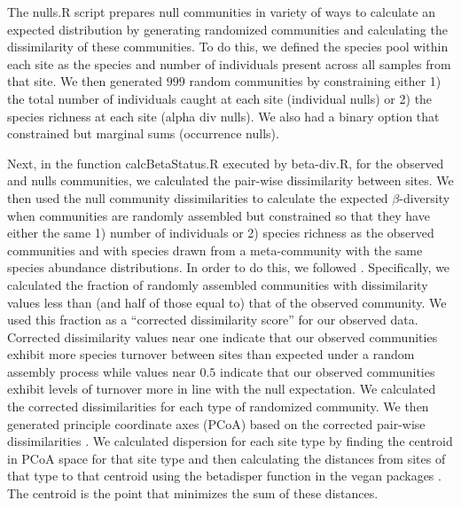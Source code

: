 \documentclass{article}\usepackage[]{graphicx}\usepackage[]{color}
\begin{document}
The nulls.R script prepares null communities in variety of ways to
calculate an expected distribution by generating randomized
communities and calculating the dissimilarity of these communities.
To do this, we defined the species pool within each site as the
species and number of individuals present across all samples from that
site.  We then generated $999$ random communities by constraining
either 1) the total number of individuals caught at each site
(individual nulls) or 2) the species richness at each site (alpha div
nulls). We also had a binary option that constrained but marginal
sums (occurrence nulls).


Next, in the function calcBetaStatus.R executed by beta-div.R, for the
observed and nulls communities, we calculated the pair-wise
dissimilarity between sites.  We then used the null community
dissimilarities to calculate the expected $\beta$-diversity when
communities are randomly assembled but constrained so that they have
either the same 1) number of individuals or 2) species richness as the
observed communities and with species drawn from a meta-community with
the same species abundance distributions.  In order to do this, we
followed \cite{chase-2011-art24}.  Specifically, we calculated the
fraction of randomly assembled communities with dissimilarity values
less than (and half of those equal to) that of the observed community.
We used this fraction as a ``corrected dissimilarity score'' for our
observed data.  Corrected dissimilarity values near one indicate that
our observed communities exhibit more species turnover between sites
than expected under a random assembly process while values near $0.5$
indicate that our observed communities exhibit levels of turnover more
in line with the null expectation. We calculated the corrected
dissimilarities for each type of randomized community. We then
generated principle coordinate axes (PCoA) based on the corrected
pair-wise dissimilarities \citep{oksanen-2013, anderson-2006-683,
anderson-2011-19, anderson-2006-245}.  We calculated dispersion for
each site type by finding the centroid in PCoA space for that site
type and then calculating the distances from sites of that type to
that centroid using the betadisper function in the vegan packages
\citep{oksanen-2013}. The centroid is the point that minimizes the sum
of these distances.
\end{document}

